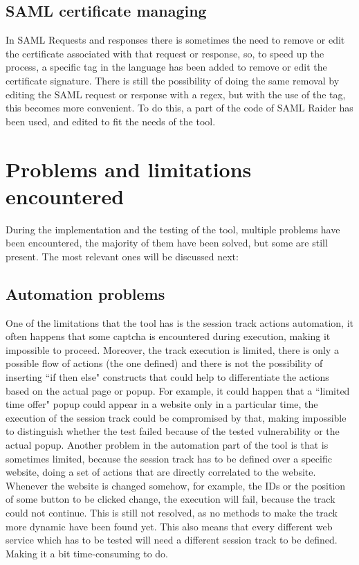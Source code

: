 \subsection{SAML certificate managing}
In \Gls{SAML} Requests and responses there is sometimes the need to remove or edit the certificate associated with that request or response, so, to speed up the process, a specific tag in the language has been added to remove or edit the certificate signature. There is still the possibility of doing the same removal by editing the \Gls{SAML} request or response with a regex, but with the use of the tag, this becomes more convenient.
To do this, a part of the code of SAML Raider \cite{saml_raider} has been used, and edited to fit the needs of the tool.

\section{Problems and limitations encountered}
\label{sec:limitations}
During the implementation and the testing of the tool, multiple problems have been encountered, the majority of them have been solved, but some are still present. The most relevant ones will be discussed next:

\subsection{Automation problems}
One of the limitations that the tool has is the session track actions automation, it often happens that some captcha is encountered during execution, making it impossible to proceed. Moreover, the track execution is limited, there is only a possible flow of actions (the one defined) and there is not the possibility of inserting ``if then else" constructs that could help to differentiate the actions based on the actual page or popup. For example, it could happen that a ``limited time offer" popup could appear in a website only in a particular time, the execution of the session track could be compromised by that, making impossible to distinguish whether the test failed because of the tested vulnerability or the actual popup.
Another problem in the automation part of the tool is that is sometimes limited, because the session track has to be defined over a specific website, doing a set of actions that are directly correlated to the website. Whenever the website is changed somehow, for example, the IDs or the position of some button to be clicked change, the execution will fail, because the track could not continue.
This is still not resolved, as no methods to make the track more dynamic have been found yet. This also means that every different web service which has to be tested will need a different session track to be defined. Making it a bit time-consuming to do. 

